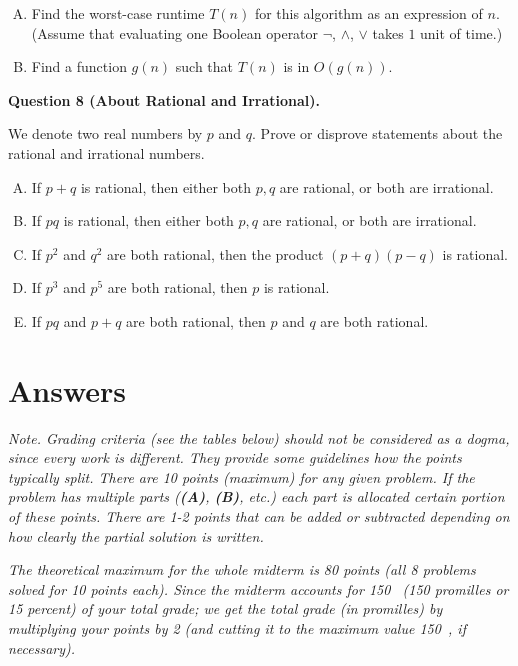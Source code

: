 \documentclass[jou]{apa6}
\begin{document}
\begin{enumerate}[(A)]
\item Find the worst-case runtime $T(n)$ for this algorithm as an expression of $n$.
(Assume that evaluating one Boolean operator $\neg$, $\wedge$, $\vee$ takes $1$ unit of time.)
\item Find a function $g(n)$ such that $T(n)$ is in $O(g(n))$. 
\end{enumerate}




\vspace{10pt}
{\bf Question 8 (About Rational and Irrational).}

We denote two real numbers by $p$ and $q$. 
Prove or disprove statements about the rational and irrational numbers. 

\begin{enumerate}[(A)]
\item If $p + q$ is rational, then either both $p,q$ are rational, or both are irrational. 
\item If $pq$ is rational, then either both $p,q$ are rational, or both are irrational. 
\item If $p^2$ and $q^2$ are both rational, then the product $(p+q)(p-q)$ is rational. 
\item If $p^3$ and $p^5$ are both rational, then $p$ is rational.
\item If $pq$ and $p+q$ are both rational, then $p$ and $q$ are both rational.
\end{enumerate}

\newpage

\section{Answers}

{\em Note. Grading criteria (see the tables below) should not be considered as a dogma, 
since every work is different. They provide some guidelines how the points typically split. 
There are 10 points (maximum) for any given problem. If the problem has multiple parts
({\bf (A)}, {\bf (B)}, etc.) each part is allocated certain portion of these points. 
There are 1-2 points that can be added or subtracted depending on how clearly the 
partial solution is written.}

{\em
The theoretical maximum for the whole midterm is 80 points (all 8 problems solved for 10 points each).
Since the midterm accounts for 150~\textperthousand{} (150 promilles or 15 percent) of your
total grade; we get the total grade (in promilles) by multiplying your points by 2
(and cutting it to the maximum value 150~\textperthousand{}, if necessary). 
}
\end{document}
